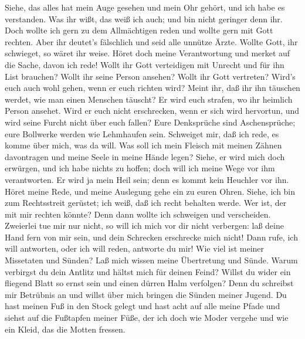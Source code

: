  Siehe, das alles hat mein Auge gesehen und mein Ohr gehört,
und ich habe es verstanden.  Was ihr wißt, das weiß ich
auch; und bin nicht geringer denn ihr.  Doch wollte ich gern
zu dem Allmächtigen reden und wollte gern mit Gott rechten. 
Aber ihr deutet's fälschlich und seid alle unnütze Ärzte. 
Wollte Gott, ihr schwieget, so wäret ihr weise.  Höret doch
meine Verantwortung und merket auf die Sache, davon ich rede!
 Wollt ihr Gott verteidigen mit Unrecht und für ihn List
brauchen?  Wollt ihr seine Person ansehen? Wollt ihr Gott
vertreten?  Wird's euch auch wohl gehen, wenn er euch
richten wird? Meint ihr, daß ihr ihn täuschen werdet, wie man einen
Menschen täuscht?  Er wird euch strafen, wo ihr heimlich
Person ansehet.  Wird er euch nicht erschrecken, wenn er
sich wird hervortun, und wird seine Furcht nicht über euch fallen?
 Eure Denksprüche sind Aschensprüche; eure Bollwerke werden
wie Lehmhaufen sein.  Schweiget mir, daß ich rede, es komme
über mich, was da will.  Was soll ich mein Fleisch mit
meinen Zähnen davontragen und meine Seele in meine Hände legen?
 Siehe, er wird mich doch erwürgen, und ich habe nichts zu
hoffen; doch will ich meine Wege vor ihm verantworten.  Er
wird ja mein Heil sein; denn es kommt kein Heuchler vor ihn.
 Höret meine Rede, und meine Auslegung gehe ein zu euren
Ohren.  Siehe, ich bin zum Rechtsstreit gerüstet; ich weiß,
daß ich recht behalten werde.  Wer ist, der mit mir rechten
könnte? Denn dann wollte ich schweigen und verscheiden. 
Zweierlei tue mir nur nicht, so will ich mich vor dir nicht verbergen:
 laß deine Hand fern von mir sein, und dein Schrecken
erschrecke mich nicht!  Dann rufe, ich will antworten, oder
ich will reden, antworte du mir!  Wie viel ist meiner
Missetaten und Sünden? Laß mich wissen meine Übertretung und Sünde.
 Warum verbirgst du dein Antlitz und hältst mich für deinen
Feind?  Willst du wider ein fliegend Blatt so ernst sein
und einen dürren Halm verfolgen?  Denn du schreibst mir
Betrübnis an und willst über mich bringen die Sünden meiner Jugend.
 Du hast meinen Fuß in den Stock gelegt und hast acht auf
alle meine Pfade und siehst auf die Fußtapfen meiner Füße, 
der ich doch wie Moder vergehe und wie ein Kleid, das die Motten
fressen.

